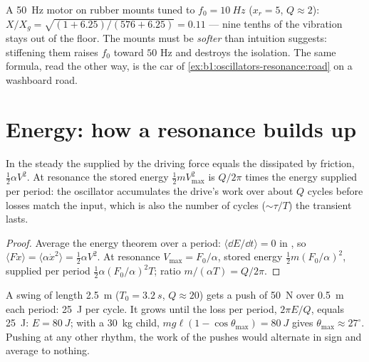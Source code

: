 \begin{example}\label{ex:b1:oscillators-resonance:mounts}
A \qty{50}{Hz} motor on rubber mounts tuned to $f_0 = \qty{10}{Hz}$
($x_r = 5$, $Q \approx 2$): $X/X_g = \sqrt{(1 + 6.25)/(576 + 6.25)} = 0.11$
--- nine tenths of the vibration stays out of the floor. The mounts must
be \emph{softer} than intuition suggests: stiffening them raises $f_0$
toward $50$ Hz and destroys the isolation. The same formula, read the
other way, is the car of \cref{ex:b1:oscillators-resonance:road} on a
washboard road.
\end{example}

\section{Energy: how a resonance builds up}

\begin{proposition}\label{prop:b1:oscillators-resonance:energy}
In the steady  the  supplied by the driving
force equals the  dissipated by friction, $\tfrac12\alpha V^2$.
At resonance the stored energy $\tfrac12 mV_{\max}^2$ is $Q/2\pi$ times
the energy supplied per period: the oscillator accumulates the drive's
work over about $Q$ cycles before losses match the input, which is also
the number of cycles ($\sim\tau/T$) the transient lasts.
\end{proposition}

\begin{proof}
Average the energy theorem over a period: $\langle\dd E/\dd t\rangle = 0$
in , so $\langle F\dot x\rangle = \langle\alpha\dot x^2\rangle =
\tfrac12\alpha V^2$. At resonance $V_{\max} = F_0/\alpha$, stored energy
$\tfrac12 m(F_0/\alpha)^2$, supplied per period $\tfrac12\alpha(F_0/\alpha)^2T$;
ratio $m/(\alpha T) = Q/2\pi$.
\end{proof}

\begin{example}\label{ex:b1:oscillators-resonance:swing}
A swing of length \qty{2.5}{m} ($T_0 = \qty{3.2}{s}$, $Q \approx 20$) gets
a push of \qty{50}{N} over \qty{0.5}{m} each period: \qty{25}{J} per
cycle. It grows until the loss per period, $2\pi E/Q$, equals
\qty{25}{J}: $E = \qty{80}{J}$; with a \qty{30}{kg} child, $mg\ell(1 -
\cos\theta_{\max}) = \qty{80}{J}$ gives $\theta_{\max} \approx 27^\circ$.
Pushing at any other rhythm, the work of the pushes would alternate in
sign and average to nothing.
\end{example}

